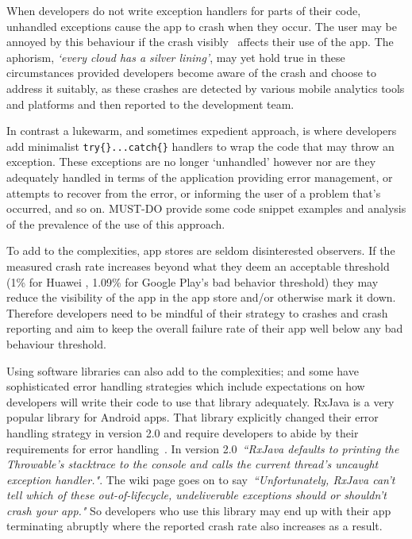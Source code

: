 When developers do not write exception handlers for parts of their code, unhandled exceptions cause the app to crash when they occur. The user may be annoyed by this behaviour if the crash visibly~  affects their use of the app. The aphorism, \emph{`every cloud has a silver lining'}, may yet hold true in these circumstances provided developers become aware of the crash and choose to address it suitably, as these crashes are detected by various mobile analytics tools and platforms and then reported to the development team.

In contrast a lukewarm, and sometimes expedient approach, is where developers add minimalist \texttt{try\{\}...catch\{\}} handlers to wrap the code that may throw an exception. These exceptions are no longer `unhandled' however nor are they adequately handled in terms of the application providing error management, or attempts to recover from the error, or informing the user of a problem that's occurred, and so on. MUST-DO provide some code snippet examples and analysis of the prevalence of the use of this approach.

To add to the complexities, app stores are seldom disinterested observers. If the measured crash rate increases beyond what they deem an acceptable threshold (1\% for Huawei %
, 1.09\% for Google Play's bad behavior threshold) they may reduce the visibility of the app in the app store and/or otherwise mark it down. Therefore developers need to be mindful of their strategy to crashes and crash reporting and aim to keep the overall failure rate of their app well below any bad behaviour threshold.

Using software libraries can also add to the complexities; and some have sophisticated error handling strategies which include expectations on how developers will write their code to use that library adequately. RxJava is a very popular library for Android apps. That library explicitly changed their error handling strategy in version 2.0 and require developers to abide by their requirements for error handling~. In version 2.0~\emph{``RxJava defaults to printing the Throwable's stacktrace to the console and calls the current thread's uncaught exception handler."}. The wiki page goes on to say~\emph{``Unfortunately, RxJava can't tell which of these out-of-lifecycle, undeliverable exceptions should or shouldn't crash your app."} So developers who use this library may end up with their app terminating abruptly where the reported crash rate also increases as a result.

